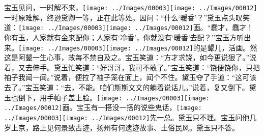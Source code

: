 宝玉见问，一时解不来，{\texttt{[image: ../Images/00003]}\texttt{[image: ../Images/00012]}\footnotesize \kaishu 一时原难解，终逊黛卿一等，正在此等处。}因问：``什么`暖香'？''黛玉点头叹笑道：{\texttt{[image: ../Images/00003]}\texttt{[image: ../Images/00012]}\footnotesize \kaishu 画。}``蠢才，蠢才！你有玉，人家就有金来配你；人家有`冷香'，你就没有`暖香'去配？''宝玉方听出来。{\texttt{[image: ../Images/00003]}\texttt{[image: ../Images/00012]}\footnotesize \kaishu 的是颦儿，活画。然这是阿颦一生心事，故每不禁自及之。}宝玉笑道：``方才求饶，如今更说狠了。''说着，又去伸手。黛玉忙笑道：``好哥哥，我可不敢了。''宝玉笑道：``饶便饶你，只把袖子我闻一闻。''说着，便拉了袖子笼在面上，闻个不住。黛玉夺了手道：``这可该去了。''宝玉笑道：``去，不能。咱们斯斯文文的躺着说话儿。''说着，复又倒下。黛玉也倒下，用手帕子盖上脸。{\texttt{[image: ../Images/00003]}\texttt{[image: ../Images/00012]}\footnotesize \kaishu 画。}宝玉有一搭没一搭的说些鬼话，{\texttt{[image: ../Images/00003]}\texttt{[image: ../Images/00012]}\footnotesize \kaishu 先一总。}黛玉只不理。宝玉问他几岁上京，路上见何景致古迹，扬州有何遗迹故事、土俗民风。黛玉只不答。

